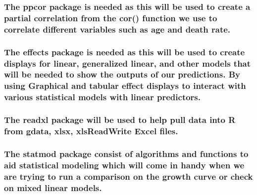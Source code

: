 \documentclass[
]{article}
\begin{document}
\hypertarget{the-ppcor-package-is-needed-as-this-will-be-used-to-create-a-partial-correlation-from-the-cor-function-we-use-to-correlate-different-variables-such-as-age-and-death-rate.}{%
\subsubsection{The ppcor package is needed as this will be used to
create a partial correlation from the cor() function we use to correlate
different variables such as age and death
rate.}\label{the-ppcor-package-is-needed-as-this-will-be-used-to-create-a-partial-correlation-from-the-cor-function-we-use-to-correlate-different-variables-such-as-age-and-death-rate.}}

\hypertarget{the-effects-package-is-needed-as-this-will-be-used-to-create-displays-for-linear-generalized-linear-and-other-models-that-will-be-needed-to-show-the-outputs-of-our-predictions.-by-using-graphical-and-tabular-effect-displays-to-interact-with-various-statistical-models-with-linear-predictors.}{%
\subsubsection{The effects package is needed as this will be used to
create displays for linear, generalized linear, and other models that
will be needed to show the outputs of our predictions. By using
Graphical and tabular effect displays to interact with various
statistical models with linear
predictors.}\label{the-effects-package-is-needed-as-this-will-be-used-to-create-displays-for-linear-generalized-linear-and-other-models-that-will-be-needed-to-show-the-outputs-of-our-predictions.-by-using-graphical-and-tabular-effect-displays-to-interact-with-various-statistical-models-with-linear-predictors.}}

\hypertarget{the-readxl-package-will-be-used-to-help-pull-data-into-r-from-gdata-xlsx-xlsreadwrite-excel-files.}{%
\subsubsection{The readxl package will be used to help pull data into R
from gdata, xlsx, xlsReadWrite Excel
files.}\label{the-readxl-package-will-be-used-to-help-pull-data-into-r-from-gdata-xlsx-xlsreadwrite-excel-files.}}

\hypertarget{the-statmod-package-consist-of-algorithms-and-functions-to-aid-statistical-modeling-which-will-come-in-handy-when-we-are-trying-to-run-a-comparison-on-the-growth-curve-or-check-on-mixed-linear-models.}{%
\subsubsection{The statmod package consist of algorithms and functions
to aid statistical modeling which will come in handy when we are trying
to run a comparison on the growth curve or check on mixed linear
models.}\label{the-statmod-package-consist-of-algorithms-and-functions-to-aid-statistical-modeling-which-will-come-in-handy-when-we-are-trying-to-run-a-comparison-on-the-growth-curve-or-check-on-mixed-linear-models.}}
\end{document}
